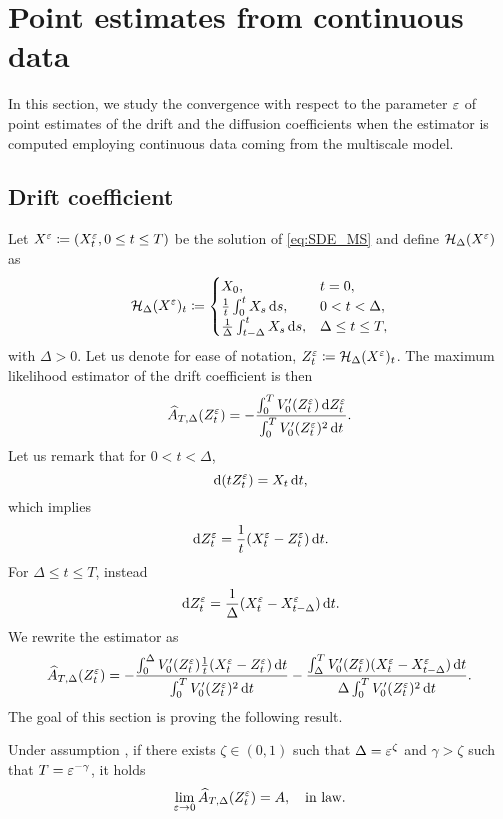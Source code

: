 \documentclass[10pt]{article}
\begin{document}
\section{Point estimates from continuous data}

In this section, we study the convergence with respect to the parameter $\varepsilon$ of point estimates of the drift and the diffusion coefficients when the estimator is computed employing continuous data coming from the multiscale model.

\subsection{Drift coefficient}\label{sec:ACont}
Let $X^\varepsilon \coloneqq (X^\varepsilon_t, 0\leq t \leq T)$ be the solution of \eqref{eq:SDE_MS} and define $\mathcal H_\Delta(X^\varepsilon)$ as
\begin{equation}\label{eq:ContMovingAverage}
	\mathcal H_\Delta(X^\varepsilon)_t \coloneqq 
	\begin{cases} 
	X_0, &t = 0, \\
	\frac1t \int_0^t X_s \,\mathrm{d} s, &0 < t < \Delta, \\
	\frac1\Delta \int_{t-\Delta}^t X_s \,\mathrm{d} s, &\Delta \leq t \leq T,\\
	\end{cases}
\end{equation}
with $\Delta > 0$. Let us denote for ease of notation, $Z^\varepsilon_t \coloneqq \mathcal H_\Delta(X^\varepsilon)_t$. The maximum likelihood estimator of the drift coefficient is then
\begin{equation}
	\widehat A_{T, \Delta}(Z_t^\varepsilon) = - \frac{\int_0^T V_0'(Z^\varepsilon_t) \,\mathrm{d} Z^\varepsilon_t}{\int_0^T V_0'(Z^\varepsilon_t)^2 \,\mathrm{d} t}.
\end{equation}
Let us remark that for $0 < t < \Delta$, 
\begin{equation}
	\,\mathrm{d} (t Z^\varepsilon_t) = X_t \,\mathrm{d} t,
\end{equation}
which implies 
\begin{equation}\label{eq:MovAvDifferential}
	\,\mathrm{d} Z^\varepsilon_t = \frac1t (X^\varepsilon_t - Z^\varepsilon_t) \,\mathrm{d} t.
\end{equation}
For $\Delta \leq t \leq T$, instead
\begin{equation}
	\,\mathrm{d} Z^\varepsilon_t = \frac1\Delta (X^\varepsilon_t - X^\varepsilon_{t-\Delta}) \,\mathrm{d} t.
\end{equation}
We rewrite the estimator as
\begin{equation}
	\widehat A_{T, \Delta}(Z_t^\varepsilon) = -\frac{\int_0^\Delta V_0'(Z^\varepsilon_t) \frac1t (X^\varepsilon_t - Z^\varepsilon_t) \,\mathrm{d} t}{\int_0^T V_0'(Z^\varepsilon_t)^2 \,\mathrm{d} t} -\frac{\int_\Delta^T V_0'(Z^\varepsilon_t) (X^\varepsilon_t - X^\varepsilon_{t-\Delta}) \,\mathrm{d} t}{\Delta\int_0^T V_0'(Z^\varepsilon_t)^2 \,\mathrm{d} t}.
\end{equation}
The goal of this section is proving the following result.
\begin{theorem}\label{thm:DriftContinuous} Under assumption , if there exists $\zeta \in (0, 1)$ such that $\Delta = \varepsilon^{\zeta}$ and $\gamma > \zeta$ such that $T = \varepsilon^{-\gamma}$, it holds 
\begin{equation}
	\lim_{\varepsilon\to 0} \widehat A_{T, \Delta}(Z_t^\varepsilon) = A, \quad \text{in law}.
\end{equation}
\end{theorem}
\end{document}
